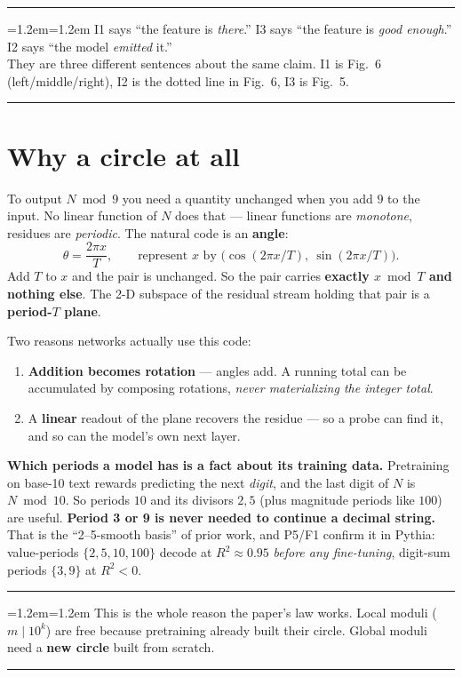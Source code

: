 \documentclass[11pt]{article}
\newenvironment{keybox}
  {\par\vspace{7pt}\noindent\hrule\vspace{5pt}%
   \begingroup\leftskip=1.2em\rightskip=1.2em\noindent\ignorespaces}
  {\par\endgroup\vspace{5pt}\hrule\vspace{7pt}}
\begin{document}
\begin{keybox}
I1 says ``the feature is \emph{there}.''\quad
I3 says ``the feature is \emph{good enough}.''\quad
I2 says ``the model \emph{emitted} it.''\\[2pt]
They are three different sentences about the same claim. I1 is Fig.~6 (left/middle/right),
I2 is the dotted line in Fig.~6, I3 is Fig.~5.
\end{keybox}

\section{Why a circle at all}

To output $N \bmod 9$ you need a quantity unchanged when you add $9$ to the input.
No linear function of $N$ does that --- linear functions are \emph{monotone},
residues are \emph{periodic}. The natural code is an \textbf{angle}:
\[
\theta = \frac{2\pi x}{T}, \qquad\text{represent } x \text{ by }
\big(\cos(2\pi x/T),\ \sin(2\pi x/T)\big).
\]
Add $T$ to $x$ and the pair is unchanged. So the pair carries \textbf{exactly
$x \bmod T$ and nothing else}. The 2-D subspace of the residual stream holding
that pair is a \textbf{period-$T$ plane}.

Two reasons networks actually use this code:
\begin{enumerate}[leftmargin=*,itemsep=2pt]
\item \textbf{Addition becomes rotation} --- angles add. A running total can be
accumulated by composing rotations, \emph{never materializing the integer total}.
\item A \textbf{linear} readout of the plane recovers the residue --- so a probe
can find it, and so can the model's own next layer.
\end{enumerate}

\textbf{Which periods a model has is a fact about its training data.} Pretraining
on base-10 text rewards predicting the next \emph{digit}, and the last digit of
$N$ is $N \bmod 10$. So periods $10$ and its divisors $2, 5$ (plus magnitude
periods like $100$) are useful. \textbf{Period 3 or 9 is never needed to continue
a decimal string.} That is the ``2--5-smooth basis'' of prior work, and P5/F1
confirm it in Pythia: value-periods $\{2,5,10,100\}$ decode at $R^2 \approx 0.95$
\emph{before any fine-tuning}, digit-sum periods $\{3,9\}$ at $R^2 < 0$.

\begin{keybox}
This is the whole reason the paper's law works. Local moduli ($m \mid 10^k$) are
free because pretraining already built their circle. Global moduli need a
\textbf{new circle} built from scratch.
\end{keybox}
\end{document}
